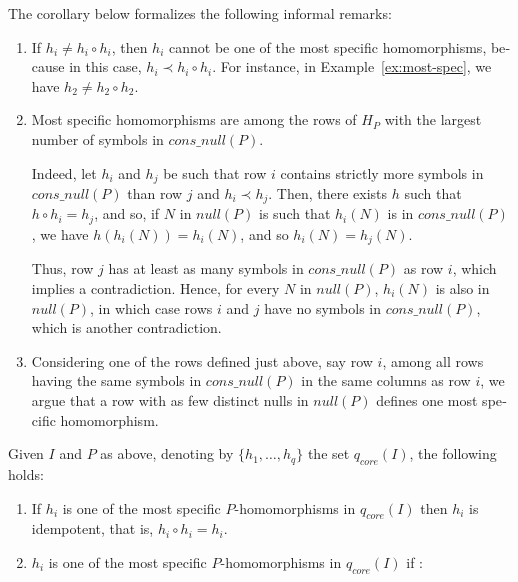 \begin{otherlanguage}{english}
The corollary below formalizes the following informal remarks:
\begin{enumerate}
    \item If $h_i \ne h_i \circ h_i$, then $h_i$ cannot be one of the most specific homomorphisms, because in this case, $h_i \prec h_i \circ h_i$.
          For instance, in Example~\ref{ex:most-spec}, we have $h_2 \neq h_2 \circ h_2$.

    \item Most specific homomorphisms are among the rows of $H_P$ with the largest number of symbols in $cons\_null(P)$.

          Indeed, let $h_i$ and $h_j$ be such that row $i$ contains strictly more symbols in $cons\_null(P)$ than row $j$ and $h_i \prec h_j$.
          Then, there exists $h$ such that $h \circ h_i = h_j$, and so, if $N$ in $null(P)$ is such that $h_i(N)$ is in $cons\_null(P)$, we have $h(h_i(N))=h_i(N)$, and so $h_i(N)=h_j(N)$.

          Thus, row $j$ has at least as many symbols in $cons\_null(P)$ as row $i$, which implies a contradiction.
          Hence, for every $N$ in $null(P)$, $h_i(N)$ is also in $null(P)$, in which case rows $i$ and $j$ have no symbols in $cons\_null(P)$, which is another contradiction.

    \item Considering one of the rows defined just above, say row $i$, among all rows having the same symbols in $cons\_null(P)$ in the same columns as row $i$, we argue that a row with as few distinct nulls in $null(P)$ defines one most specific homomorphism.
\end{enumerate}

\begin{corollary}
    \label{coro: spec}
    Given $I$ and $P$ as above, denoting by $\{h_1, \ldots, h_q\}$ the set $q_{core}(I)$, the following holds:
    \begin{enumerate}
        \item If $h_i$ is one of the most specific $P$-homomorphisms in $q_{core}(I)$ then $h_i$ is idempotent, that is, $h_i \circ h_i = h_i$.

        \item $h_{i}$ is one of the most specific $P$-homomorphisms in $q_{core}(I)$ if :
    \end{enumerate}
\end{corollary}


\end{otherlanguage}
